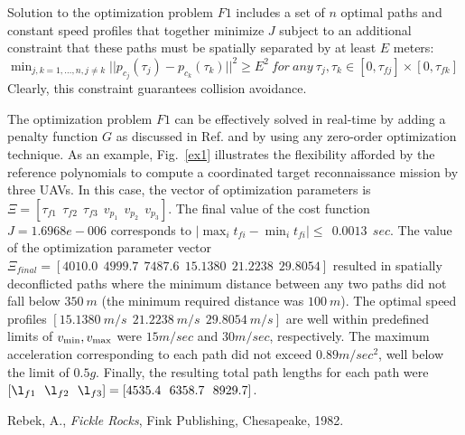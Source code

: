 \documentclass[]{aiaa-tc}%
\begin{document}
Solution to the optimization problem $F1$ includes a set of $n$ optimal paths and constant speed profiles
that together minimize $J$ subject to an additional constraint that these paths must be spatially separated
by at least $E$ meters:
$\displaystyle{\min_{j,k = 1, \ldots, n, j \ne k} || p_{c_j}(\tau_j)
- p_{c_k}(\tau_k)||^2 \ge E^2 ~ for ~ any ~ \tau_j, \tau_k \in [0,
\tau_{fj}] \times [0, \tau_{fk}]}$
Clearly, this constraint guarantees collision avoidance.


The optimization problem $ F1$ can be effectively solved in
real-time by adding a penalty function $G$ as discussed in Ref.
\cite{Yakimenko} and by using any zero-order optimization
technique. As an example, Fig.~\ref{ex1} illustrates the
flexibility afforded by the reference polynomials to compute a
coordinated target reconnaissance mission by three UAVs. In this
case, the vector of optimization parameters is $\Xi = [\tau_{f1}
~~ \tau_{f2} ~~ \tau_{f3} ~~ v_{p_1} ~~ v_{p_2}~~ v_{p_3}]$. The
final value of the cost function $J = 1.6968e-006$ corresponds to
$|\max_i t_{fi} - \min_i t_{fi}| \le ~~ 0.0013 ~~ sec$. The value
of the optimization parameter vector $\Xi_{final} = [4010.0 ~~
4999.7 ~~ 7487.6 ~~ 15.1380 ~~ 21.2238 ~~ 29.8054]$ resulted in
spatially deconflicted paths where the minimum distance between
any two paths did not fall below $350 ~ m$ (the minimum required
distance was $100 ~ m$). The optimal speed profiles $[15.1380~m/s
~~ 21.2238~m/s ~~ 29.8054~m/s]$ are well within predefined limits
of $v_{{\rm min}}, v_{{\rm max}}$ were $15 m/sec$ and $30 m/sec$,
respectively.
The maximum acceleration corresponding to
each path did not exceed $0.89 m/sec^2$, well below the limit of
$0.5 g$.  Finally, the resulting total path lengths for each path were
$[ \l_{f1} ~~ \l_{f2} ~~ \l_{f3} ] = [4535.4 ~~ 6358.7  ~~ 8929.7]$.




%
%



\begin{thebibliography}{9}%
 Rebek, A., {\it Fickle Rocks}, Fink Publishing, Chesapeake, 1982.
\end{thebibliography}
\end{document}
